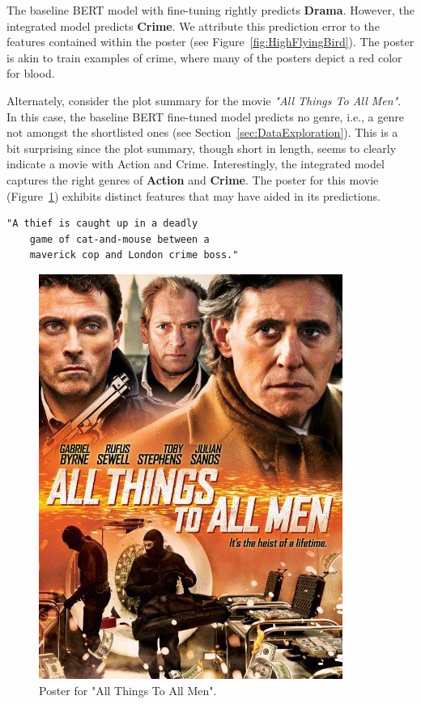 \documentclass[10pt]{article}
\begin{document}
The baseline BERT model with fine-tuning rightly predicts \textbf{Drama}. However, the integrated model predicts \textbf{Crime}. We attribute this prediction error to the features contained within the poster (see Figure~\ref{fig:HighFlyingBird}). The poster is akin to train examples of crime, where many of the posters depict a red color for blood.

Alternately, consider the plot summary for the movie \textit{"All Things To All Men"}. In this case, the baseline BERT fine-tuned model predicts no genre, i.e., a genre not amongst the shortlisted ones (see Section~\ref{sec:DataExploration}). This is a bit surprising since the plot summary, though short in length, seems to clearly indicate a movie with Action and Crime. Interestingly, the integrated model captures the right genres of \textbf{Action} and \textbf{Crime}. The poster for this movie (Figure~\ref{fig:AllThingsToAllMen}) exhibits distinct features that may have aided in its predictions.  
\begin{Verbatim}[fontsize=\small]
    "A thief is caught up in a deadly 
    game of cat-and-mouse between a 
    maverick cop and London crime boss."
\end{Verbatim}

\begin{figure}[!h]
    \centering
    \includegraphics[scale=0.2]{images/AllThingsToAllMen2.jpg}
    \caption{Poster for "All Things To All Men".}
    \label{fig:AllThingsToAllMen}
\end{figure}
\end{document}
